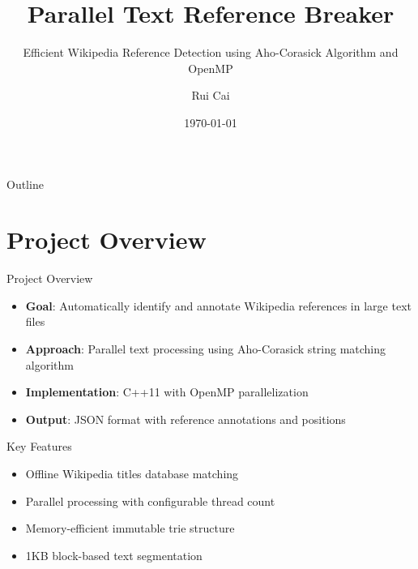 \documentclass[aspectratio=169]{beamer}
\title[Parallel Text Reference Breaker]{Parallel Text Reference Breaker}
\subtitle{Efficient Wikipedia Reference Detection using Aho-Corasick Algorithm and OpenMP}
\author{Rui Cai}
\institute{Parallel Programming Course Project 2025}
\date{\today}
\begin{document}
\frame{\titlepage}

\begin{frame}{Outline}
\tableofcontents
\end{frame}

\section{Project Overview}

\begin{frame}{Project Overview}
\begin{itemize}
    \item \textbf{Goal}: Automatically identify and annotate Wikipedia references in large text files
    \item \textbf{Approach}: Parallel text processing using Aho-Corasick string matching algorithm
    \item \textbf{Implementation}: C++11 with OpenMP parallelization
    \item \textbf{Output}: JSON format with reference annotations and positions
\end{itemize}

\vspace{0.5cm}
\begin{block}{Key Features}
\begin{itemize}
    \item Offline Wikipedia titles database matching
    \item Parallel processing with configurable thread count
    \item Memory-efficient immutable trie structure
    \item 1KB block-based text segmentation
\end{itemize}
\end{block}
\end{frame}
\end{document}
